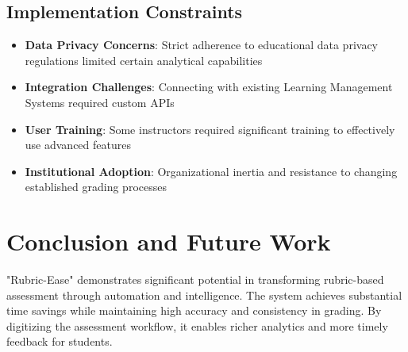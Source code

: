 \documentclass[12pt]{article}
\begin{document}

\subsection{Implementation Constraints}
\begin{itemize}
    \item \textbf{Data Privacy Concerns}: Strict adherence to educational data privacy regulations limited certain analytical capabilities
    \item \textbf{Integration Challenges}: Connecting with existing Learning Management Systems required custom APIs
    \item \textbf{User Training}: Some instructors required significant training to effectively use advanced features
    \item \textbf{Institutional Adoption}: Organizational inertia and resistance to changing established grading processes
\end{itemize}

\section{Conclusion and Future Work}
"Rubric-Ease" demonstrates significant potential in transforming rubric-based assessment through automation and intelligence. The system achieves substantial time savings while maintaining high accuracy and consistency in grading. By digitizing the assessment workflow, it enables richer analytics and more timely feedback for students.


\end{document}
\end{itemize}
\end{document}
